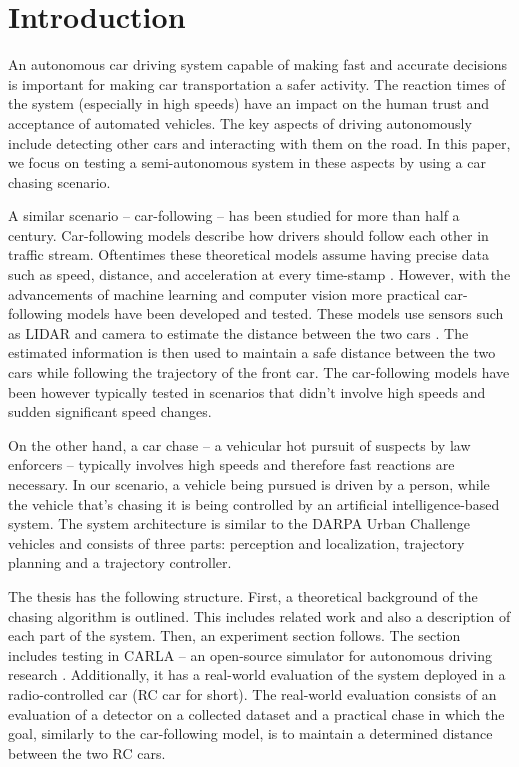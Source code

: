 \maketitle

\chapter{Introduction}
An autonomous car driving system capable of making fast and accurate decisions is important for making car transportation a safer activity. The reaction times of the system (especially in high speeds) have an impact on the human trust and acceptance of automated vehicles. The key aspects of driving autonomously include detecting other cars and interacting with them on the road. In this paper, we focus on testing a semi-autonomous system in these aspects by using a car chasing scenario. \par


A similar scenario -- car-following -- has been studied for more than half a century. Car-following models describe how drivers should follow each other in traffic stream. Oftentimes these theoretical models assume having precise data such as speed, distance, and acceleration at every time-stamp \cite{car_following}. However, with the advancements of machine learning and computer vision more practical car-following models have been developed and tested. These models use sensors such as LIDAR and camera to estimate the distance between the two cars \cite{lidar_highway}. The estimated information is then used to maintain a safe distance between the two cars while following the trajectory of the front car. The car-following models have been however typically tested in scenarios that didn't involve high speeds and sudden significant speed changes. \par
 
 
On the other hand, a car chase -- a vehicular hot pursuit of suspects by law enforcers -- typically involves high speeds and therefore fast reactions are necessary. In our scenario, a vehicle being pursued is driven by a person, while the vehicle that's chasing it is being controlled by an artificial intelligence-based system. The system architecture is similar to the DARPA Urban Challenge vehicles \cite{Bertha}\cite{darpa2}\cite{darpa_book} and consists of three parts: perception and localization, trajectory planning and a trajectory controller. \par


The thesis has the following structure. First, a theoretical background of the chasing algorithm is outlined. This includes related work and also a description of each part of the system. Then, an experiment section follows. The section includes testing in CARLA -- an open-source simulator for autonomous driving research \cite{CARLA}. Additionally, it has a real-world evaluation of the system deployed in a radio-controlled car (RC car for short). The real-world evaluation consists of an evaluation of a detector on a collected dataset and a practical chase in which the goal, similarly to the car-following model, is to maintain a determined distance between the two RC cars.




